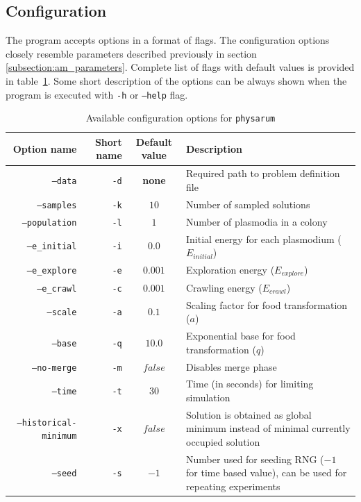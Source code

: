 \documentclass[english,a4paper,twoside]{ppfcmthesis}
\begin{document}
\subsection{Configuration}

The program accepts options in a format of flags. The configuration options closely resemble parameters described previously in section \ref{subsection:am_parameters}. Complete list of flags with default values is provided in table~\ref{table:pi_options}. Some short description of the options can be always shown when the program is executed with \texttt{-h} or \texttt{--help} flag.

\begin{table}[h]
  \centering
  \caption{Available configuration options for \texttt{physarum}}
  \label{table:pi_options}
  \begin{tabularx}{\textwidth}{r|r|c|X}
    Option name & Short name & Default value & Description \\ \hline \hline
    \texttt{--data} & \texttt{-d} & \textbf{none} & Required path to problem definition file \\ \hline
    \texttt{--samples} & \texttt{-k} & $10$ & Number of sampled solutions \\ \hline
    \texttt{--population} & \texttt{-l} & $1$ & Number of plasmodia in a colony \\ \hline
    \texttt{--e\_initial} & \texttt{-i} & $0.0$ & Initial energy for each plasmodium ($E_{initial}$) \\ \hline
    \texttt{--e\_explore} & \texttt{-e} & $0.001$ & Exploration energy ($E_{explore}$) \\ \hline
    \texttt{--e\_crawl} & \texttt{-c} & $0.001$ & Crawling energy ($E_{crawl}$) \\ \hline
    \texttt{--scale} & \texttt{-a} & $0.1$ & Scaling factor for food transformation ($a$) \\ \hline
    \texttt{--base} & \texttt{-q} & $10.0$ & Exponential base for food transformation ($q$) \\ \hline
    \texttt{--no-merge} & \texttt{-m} & $false$ & Disables merge phase \\ \hline
    \texttt{--time} & \texttt{-t} & $30$ & Time (in seconds) for limiting simulation \\ \hline
    \texttt{--historical-minimum} & \texttt{-x} & $false$ & Solution is obtained as global minimum instead of minimal currently occupied solution \\ \hline
    \texttt{--seed} & \texttt{-s} & $-1$ & Number used for seeding RNG ($-1$ for time based value), can be used for repeating experiments \\ \hline \hline
  \end{tabularx}
\end{table}
\end{document}
